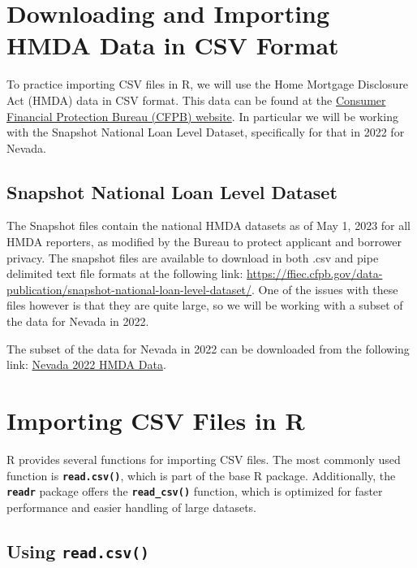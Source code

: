 \documentclass[
]{book}
\begin{document}
\section{Downloading and Importing HMDA Data in CSV Format}\label{downloading-and-importing-hmda-data-in-csv-format}

To practice importing CSV files in R, we will use the Home Mortgage Disclosure Act (HMDA) data in CSV format. This data can be found at the \href{https://ffiec.cfpb.gov/}{Consumer Financial Protection Bureau (CFPB) website}. In particular we will be working with the Snapshot National Loan Level Dataset, specifically for that in 2022 for Nevada.

\subsection{Snapshot National Loan Level Dataset}\label{snapshot-national-loan-level-dataset}

The Snapshot files contain the national HMDA datasets as of May 1, 2023 for all HMDA reporters, as modified by the Bureau to protect applicant and borrower privacy. The snapshot files are available to download in both .csv and pipe delimited text file formats at the following link: \url{https://ffiec.cfpb.gov/data-publication/snapshot-national-loan-level-dataset/}. One of the issues with these files however is that they are quite large, so we will be working with a subset of the data for Nevada in 2022.

The subset of the data for Nevada in 2022 can be downloaded from the following link: \href{https://ffiec.cfpb.gov/v2/data-browser-api/view/csv?states=NV&years=2022}{Nevada 2022 HMDA Data}.

\section{Importing CSV Files in R}\label{importing-csv-files-in-r}

R provides several functions for importing CSV files. The most commonly used function is \textbf{\texttt{read.csv()}}, which is part of the base R package. Additionally, the \textbf{\texttt{readr}} package offers the \textbf{\texttt{read\_csv()}} function, which is optimized for faster performance and easier handling of large datasets.

\subsection{\texorpdfstring{Using \texttt{read.csv()}}{Using read.csv()}}\label{using-read.csv}
\end{document}
